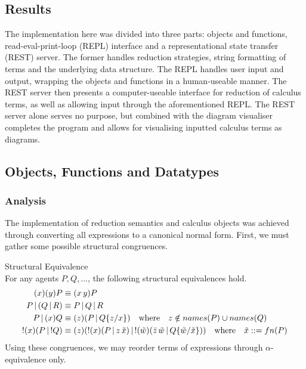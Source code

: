 \subsection{Results}

    The implementation here was divided into three parts: objects and functions, read-eval-print-loop (REPL) interface and a representational state transfer (REST) server.
    The former handles reduction strategies, string formatting of terms and the underlying data structure.
    The REPL handles user input and output, wrapping the objects and functions in a human-useable manner.
    The REST server then presents a computer-useable interface for reduction of calculus terms, as well as allowing input through the aforementioned REPL.
    The REST server alone serves no purpose, but combined with the diagram visualiser completes the program and allows for visualising inputted calculus terms as diagrams.


\subsection{Objects, Functions and Datatypes}
    
    \subsubsection{Analysis}\label{sssec:calculus-analysis}
        The implementation of reduction semantics and calculus objects was achieved through converting all expressions to a canonical normal form.
        First, we must gather some possible structural congruences.

        \begin{lemma}{Structural Equivalence\\}
            For any agents $P, Q, \ldots$, the following structural equivalences hold.
            \begin{align*}
                (x)(y) P                & \equiv (x \, y) P \\
                P \, | \, (Q \, | \, R) & \equiv P \, | \, Q \, | \, R \\
                P \, | \, (x) Q         & \equiv (z)(P \, | \, Q\{z / x\}) \quad \text{where} \quad z \notin names(P) \cup names(Q) \\
                !(x)(P \, | \, !Q)      & \equiv (z)(!(x)(P \, | \, z \, \tilde{x}) \, | \, !(\tilde{w})(\bar{z} \, \tilde{w} \, | \, Q\{\tilde{w}/\tilde{x}\})) \quad \text{where} \quad \tilde{x} ::= fn(P)
            \end{align*}
            Using these congruences, we may reorder terms of expressions through $\alpha$-equivalence only.
        \end{lemma}


